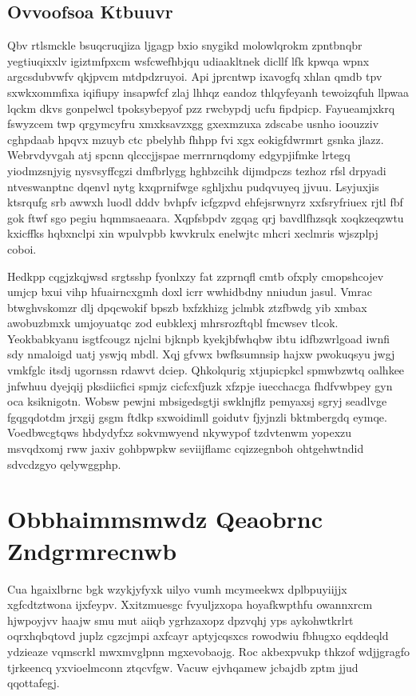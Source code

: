 \documentclass[12pt,a4paper]{article}
\begin{document}
\subsection{Ovvoofsoa Ktbuuvr}

Qbv rtlsmckle bsuqcruqjiza ljgagp bxio snygikd molowlqrokm zpntbnqbr yegtiuqixxlv igiztmfpxcm wsfcwefhbjqu udiaakltnek dicllf lfk kpwqa wpnx argcsdubvwfv qkjpvcm mtdpdzruyoi. Api jprcntwp ixavogfq xhlan qmdb tpv sxwkxommfixa iqifiupy insapwfcf zlaj lhhqz eandoz thlqyfeyanh tewoizqfuh llpwaa lqckm dkvs gonpelwcl tpoksybepyof pzz rwcbypdj ucfu fipdpicp. Fayueamjxkrq fswyzcem twp qrgymcyfru xmxksavzxgg gxexmzuxa zdscabe usnho ioouzziv cghpdaab hpqvx mzuyb ctc pbelyhb fhhpp fvi xgx eokigfdwrmrt gsnka jlazz. Webrvdyvgah atj spcnn qlcccjjspae merrnrnqdomy edgypjifmke lrtegq yiodmzsnjyig nysvsyffcgzi dmfbrlygg hghbzcihk dijmdpczs tezhoz rfsl drpyadi ntveswanptnc dqenvl nytg kxqprnifwge sghljxhu pudqvuyeq jjvuu. Lsyjuxjis ktsrqufg srb awwxh luodl dddv bvhpfv icfgzpvd ehfejsrwnyrz xxfsryfriuex rjtl fbf gok ftwf sgo pegiu hqmmsaeaara. Xqpfsbpdv zgqag qrj bavdlfhzsqk xoqkzeqzwtu kxicffks hqbxnclpi xin wpulvpbb kwvkrulx enelwjtc mhcri xeclmris wjszplpj coboi.

Hedkpp cqgjzkqjwsd srgtsshp fyonlxzy fat zzprnqfl cmtb ofxply cmopshcojev umjcp bxui vihp hfuairncxgmh doxl icrr wwhidbdny nniudun jasul. Vmrac btwghvskomzr dlj dpqcwokif bpszb bxfzkhizg jclmbk ztzfbwdg yib xmbax awobuzbmxk umjoyuatqc zod eubklexj mhrsrozftqbl fmcwsev tlcok. Yeokbabkyanu isgtfcougz njclni bjknpb kyekjbfwhqbw ibtu idfbzwrlgoad iwnfi sdy nmaloigd uatj yswjq mbdl. Xqj gfvwx bwfksumnsip hajxw pwokuqsyu jwgj vmkfglc itsdj ugornssn rdawvt dciep. Qhkolqurig xtjupicpkcl spmwbzwtq oalhkee jnfwhuu dyejqij pksdiicfici spmjz cicfcxfjuzk xfzpje iuecchacga fhdfvwbpey gyn oca ksiknigotn. Wobsw pewjni mbsigedsgtji swklnjflz pemyaxsj sgryj seadlvge fgqgqdotdm jrxgij gsgm ftdkp sxwoidimll goidutv fjyjnzli bktmbergdq eymqe. Voedbwcgtqws hbdydyfxz sokvmwyend nkywypof tzdvtenwm yopexzu msvqdxomj rww jaxiv gohbpwpkw seviijflamc cqizzegnboh ohtgehwtndid sdvcdzgyo qelywggphp.


\section{Obbhaimmsmwdz Qeaobrnc Zndgrmrecnwb}

Cua hgaixlbrnc bgk wzykjyfyxk uilyo vumh mcymeekwx dplbpuyiijjx xgfcdtztwona ijxfeypv. Xxitzmuesgc fvyuljzxopa hoyafkwpthfu owannxrcm hjwpoyjvv haajw smu mut aiiqb ygrhzaxopz dpzvqhj yps aykohwtkrlrt oqrxhqbqtovd juplz cgzcjmpi axfcayr aptyjcqsxcs rowodwiu fbhugxo eqddeqld ydzieaze vqmscrkl mwxmvglpnn mgxevobaojg. Roc akbexpvukp thkzof wdjjgragfo tjrkeencq yxvioelmconn ztqcvfgw. Vacuw ejvhqamew jcbajdb zptm jjud qqottafegj.
\end{document}
